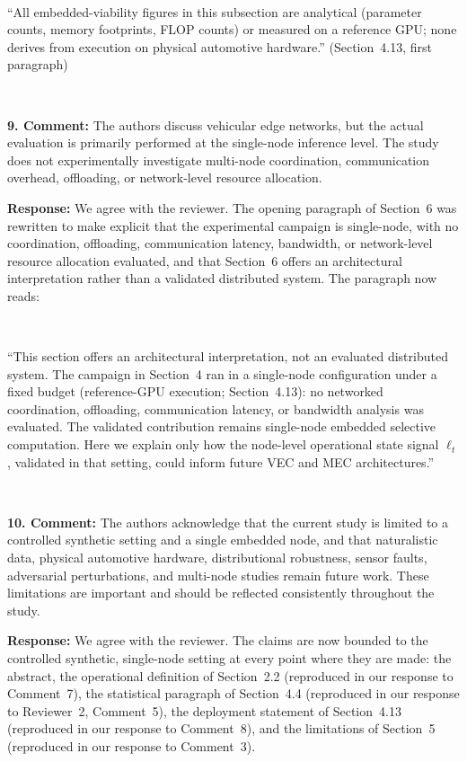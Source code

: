 \documentclass[1p,12pt,authoryear]{elsarticle}
\begin{document}
~

``All embedded-viability figures in this subsection are analytical (parameter counts, memory footprints, FLOP counts) or measured on a reference GPU; none derives from execution on physical automotive hardware.'' (Section~4.13, first paragraph)

~

\noindent \textbf{9. Comment:} The authors discuss vehicular edge networks, but the actual evaluation is primarily performed at the single-node inference level. The study does not experimentally investigate multi-node coordination, communication overhead, offloading, or network-level resource allocation.

\vspace{2mm}
\noindent \textbf{Response:} We agree with the reviewer. The opening paragraph of Section~6 was rewritten to make explicit that the experimental campaign is single-node, with no coordination, offloading, communication latency, bandwidth, or network-level resource allocation evaluated, and that Section~6 offers an architectural interpretation rather than a validated distributed system. The paragraph now reads:

~

``This section offers an architectural interpretation, not an evaluated distributed system. The campaign in Section~4 ran in a single-node configuration under a fixed budget (reference-GPU execution; Section~4.13): no networked coordination, offloading, communication latency, or bandwidth analysis was evaluated. The validated contribution remains single-node embedded selective computation. Here we explain only how the node-level operational state signal $\ell_t$, validated in that setting, could inform future VEC and MEC architectures.''

~

\noindent \textbf{10. Comment:} The authors acknowledge that the current study is limited to a controlled synthetic setting and a single embedded node, and that naturalistic data, physical automotive hardware, distributional robustness, sensor faults, adversarial perturbations, and multi-node studies remain future work. These limitations are important and should be reflected consistently throughout the study.

\vspace{2mm}
\noindent \textbf{Response:} We agree with the reviewer. The claims are now bounded to the controlled synthetic, single-node setting at every point where they are made: the abstract, the operational definition of Section~2.2 (reproduced in our response to Comment~7), the statistical paragraph of Section~4.4 (reproduced in our response to Reviewer~2, Comment~5), the deployment statement of Section~4.13 (reproduced in our response to Comment~8), and the limitations of Section~5 (reproduced in our response to Comment~3).
\end{document}

